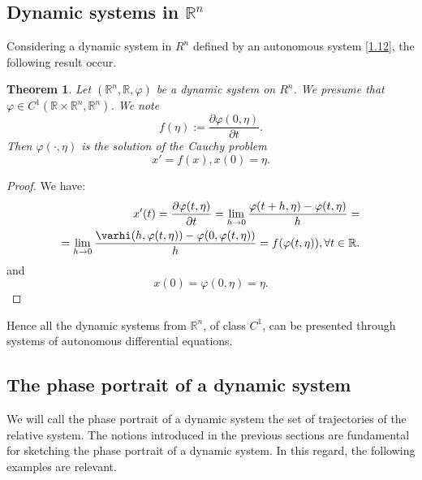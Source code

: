\documentclass[a4paper,11pt]{report}
\newtheorem{theorem}{Theorem}[subsection]
\newcommand{\R}{\mathbb{R}}
\begin{document}
\subsection{Dynamic systems in $\R^{n}$}
 Considering a dynamic system in $R^{n}$ defined by an autonomous system \eqref{1.12}, the following result occur.
 \begin{theorem}
  Let $(\R^{n},\R,\varphi)$ be a dynamic system on $R^{n}$. We presume that $\varphi\in C^{1}(\R\times\R^{n},\R^{n})$. We note $$f(\eta):=\frac{\partial \varphi(0,\eta)}{\partial t}.$$ Then $\varphi(\cdot,\eta)$ is the solution of the Cauchy problem 
  \begin{equation}\label{1.14}
   x'=f(x),x(0)=\eta.
  \end{equation}

 \end{theorem}
\begin{proof}
 We have:
 \begin{align*}
  x'(t)=\frac{\partial \varphi(t,\eta)}{\partial t}=\lim_{h\rightarrow 0}\frac{\varphi(t+h,\eta)-\varphi(t,\eta)}{h}=\\
  =\lim_{h\rightarrow 0}\frac{\varhi(h,\varphi(t,\eta))-\varphi(0,\varphi(t,\eta))}{h}=f(\varphi(t,\eta)), \forall t\in \R.  
 \end{align*}
and $$x(0)=\varphi(0,\eta)=\eta.$$
\end{proof}
Hence all the dynamic systems from $\R^{n}$, of class $C^{1}$, can be presented through systems of autonomous differential equations.
\subsection{The phase portrait of a dynamic system}
 We will call the phase portrait of a dynamic system the set of trajectories of the relative system. The notions introduced in the previous sections are fundamental for sketching the phase portrait of a dynamic system. In this regard, the following examples are relevant.
\end{document}
